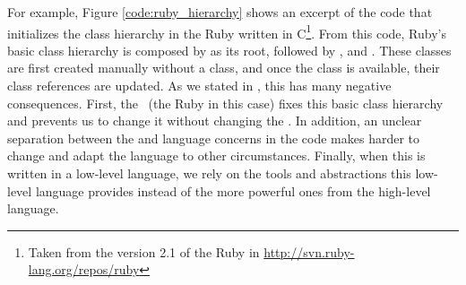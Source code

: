 For example, Figure \ref{code:ruby_hierarchy} shows an excerpt of the code that initializes the class hierarchy in the Ruby \VM written in C\footnote{Taken from the version 2.1 of the Ruby \VM in \url{http://svn.ruby-lang.org/repos/ruby}}. From this code, Ruby's basic class hierarchy is composed by  as its root, followed by ,  and . These classes are first created manually without a class, and once the class  is available, their class references are updated. As we stated in , this has many negative consequences. First, the \VM~(the Ruby \VM in this case) fixes this basic class hierarchy and prevents us to change it without changing the \VM.
In addition, an unclear separation between the \VM and language concerns in the \VM code makes harder to change and adapt the language to other circumstances. Finally, when this \VM is written in a low-level language, we rely on the tools and abstractions this low-level language provides instead of the more powerful ones from the high-level language. 




